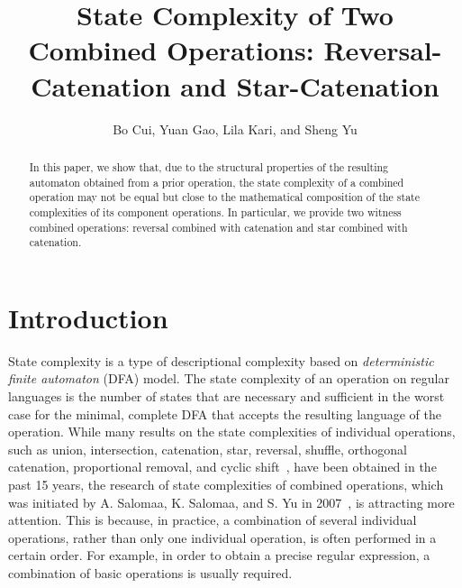 \documentclass[10pt]{article}
\title{State Complexity of Two Combined Operations: Reversal-Catenation and Star-Catenation}
\author{Bo Cui, Yuan Gao, Lila Kari, and Sheng Yu}
\begin{document}
\maketitle

\begin{abstract}
In this paper, we show that, due to the structural properties of the resulting automaton obtained from a prior operation, the state complexity of a combined operation may not be equal but close to the mathematical composition of the state complexities of its component operations.
In particular, we provide two witness combined operations: reversal combined with catenation and star combined with catenation.
\end{abstract}

\section{Introduction}
State complexity is a type of descriptional complexity based on {\it
deterministic finite automaton} (DFA) model. The state complexity of
an operation on regular languages is the number of states that are
necessary and sufficient in the worst case for the minimal, complete
DFA that accepts the resulting language of the operation. While many
results on the state complexities of individual operations, such as
union, intersection, catenation, star, reversal, shuffle, orthogonal
catenation, proportional removal, and cyclic
shift~\cite{CaSaYu02,DaDoSa08,Domaratzki02,HoKu02,JiJiSz05,JiOk05,Jriaskova05,SaWoYu04,YuZhSa94,Yu01},
have been obtained in the past 15 years, the research of state
complexities of combined operations, which was initiated by A.
Salomaa, K. Salomaa, and S. Yu in 2007~\cite{SaSaYu07}, is
attracting more attention. This is because, in practice, a
combination of several individual operations, rather than only one
individual operation, is often performed in a certain order. For
example, in order to obtain a precise regular expression, a
combination of basic operations is usually required.
\end{document}
